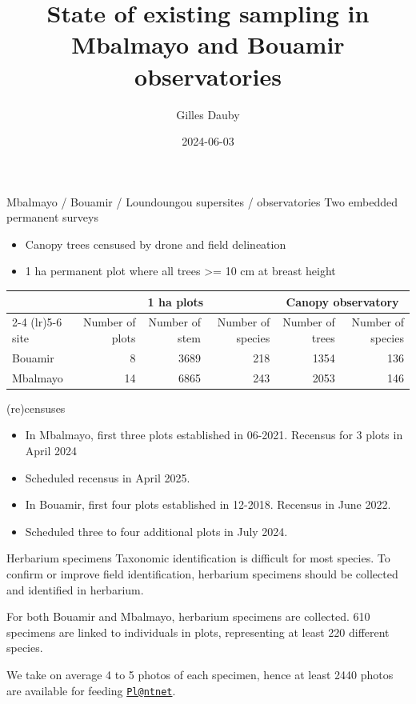 \documentclass[
  ignorenonframetext,
]{beamer}
\title{State of existing sampling in Mbalmayo and Bouamir observatories}
\author{Gilles Dauby}
\date{2024-06-03}
\providecommand{\tightlist}{%
  \setlength{\itemsep}{0pt}\setlength{\parskip}{0pt}}
\begin{document}
\frame{\titlepage}

\begin{frame}{Mbalmayo / Bouamir / Loundoungou supersites /
observatories}
\label{mbalmayo-bouamir-loundoungou-supersites-observatories}
Two embedded permanent surveys

\begin{itemize}
\tightlist
\item
  Canopy trees censused by drone and field delineation
\item
  1 ha permanent plot where all trees \textgreater= 10 cm at breast
  height
\end{itemize}

\begin{longtable}{lrrrrr}
\toprule
 & \multicolumn{3}{c}{1 ha plots} & \multicolumn{2}{c}{Canopy observatory} \\ 
\cmidrule(lr){2-4} \cmidrule(lr){5-6}
site & Number of 
plots & Number of stem & Number of species & Number of trees & Number of species \\ 
\midrule\addlinespace[2.5pt]
Bouamir & 8 & 3689 & 218 & 1354 & 136 \\ 
Mbalmayo & 14 & 6865 & 243 & 2053 & 146 \\ 
\bottomrule
\end{longtable}
\end{frame}

\begin{frame}{(re)censuses}
\label{recensuses}
\begin{itemize}
\item
  In Mbalmayo, first three plots established in 06-2021. Recensus for 3
  plots in April 2024
\item
  Scheduled recensus in April 2025.
\item
  In Bouamir, first four plots established in 12-2018. Recensus in June
  2022.
\item
  Scheduled three to four additional plots in July 2024.
\end{itemize}
\end{frame}

\begin{frame}{Herbarium specimens}
\label{herbarium-specimens}
Taxonomic identification is difficult for most species. To confirm or
improve field identification, herbarium specimens should be collected
and identified in herbarium.

For both Bouamir and Mbalmayo, herbarium specimens are collected. 610
specimens are linked to individuals in plots, representing at least 220
different species.

We take on average 4 to 5 photos of each specimen, hence at least 2440
photos are available for feeding
\href{mailto:Pl@ntnet}{\nolinkurl{Pl@ntnet}}.
\end{frame}
\end{document}
